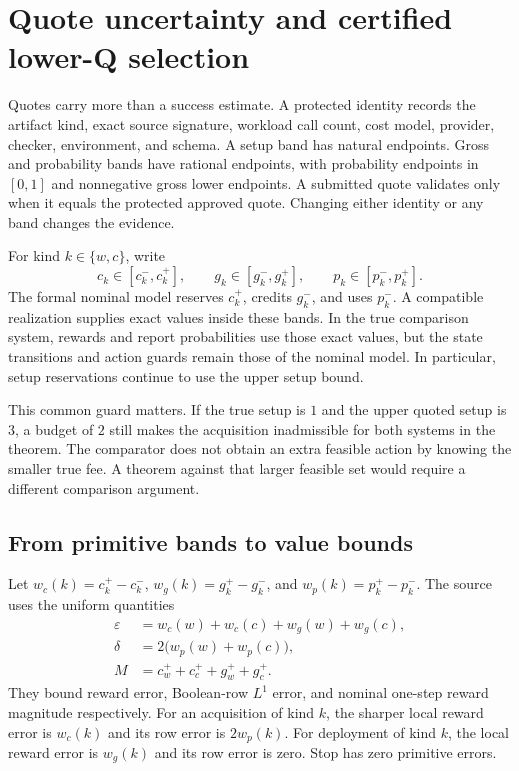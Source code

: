 \section{Quote uncertainty and certified lower-Q selection}
\label{sec:quotes}

Quotes carry more than a success estimate. A protected identity records the
artifact kind, exact source signature, workload call count, cost model, provider,
checker, environment, and schema. A setup band has natural endpoints. Gross
and probability bands have rational endpoints, with probability endpoints in
$[0,1]$ and nonnegative gross lower endpoints. A submitted quote validates only
when it equals the protected approved quote. Changing either identity or any
band changes the evidence.

For kind $k\in\{w,c\}$, write
\[
 c_k\in[c_k^-,c_k^+],\qquad
 g_k\in[g_k^-,g_k^+],\qquad
 p_k\in[p_k^-,p_k^+].
\]
The formal nominal model reserves $c_k^+$, credits $g_k^-$, and uses $p_k^-$.
A compatible realization supplies exact values inside these bands. In the true
comparison system, rewards and report probabilities use those exact values,
but the state transitions and action guards remain those of the nominal model.
In particular, setup reservations continue to use the upper setup bound.

This common guard matters. If the true setup is $1$ and the upper quoted setup
is $3$, a budget of $2$ still makes the acquisition inadmissible for both systems
in the theorem. The comparator does not obtain an extra feasible action by
knowing the smaller true fee. A theorem against that larger feasible set would
require a different comparison argument.

\subsection{From primitive bands to value bounds}

Let $w_c(k)=c_k^+-c_k^-$, $w_g(k)=g_k^+-g_k^-$, and
$w_p(k)=p_k^+-p_k^-$. The source uses the uniform quantities
\begin{align}
 \varepsilon&=w_c(w)+w_c(c)+w_g(w)+w_g(c),\\
 \delta&=2\bigl(w_p(w)+w_p(c)\bigr),\\
 M&=c_w^++c_c^++g_w^++g_c^+.
\end{align}
They bound reward error, Boolean-row $L^1$ error, and nominal one-step reward
magnitude respectively. For an acquisition of kind $k$, the sharper local
reward error is $w_c(k)$ and its row error is $2w_p(k)$. For deployment of kind
$k$, the local reward error is $w_g(k)$ and its row error is zero. Stop has zero
primitive errors.

